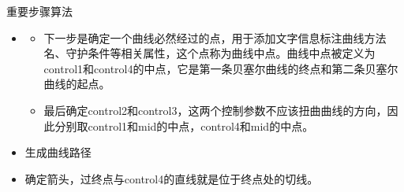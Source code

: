 \documentclass{beamer}
\begin{document}
\begin{frame}{重要步骤算法}
  \begin{itemize}
  \item 
    \begin{itemize}
    \item 下一步是确定一个曲线必然经过的点，用于添加文字信息标注曲线方法名、守护条件等相关属性，这个点称为曲线中点。曲线中点被定义为control1和control4的中点，它是第一条贝塞尔曲线的终点和第二条贝塞尔曲线的起点。\pause
    \item 最后确定control2和control3，这两个控制参数不应该扭曲曲线的方向，因此分别取control1和mid的中点，control4和mid的中点。\pause
    \end{itemize}
  \item 生成曲线路径 \pause
  \item 确定箭头，过终点与control4的直线就是位于终点处的切线。 \pause
  \end{itemize}
\end{frame}
\end{document}
